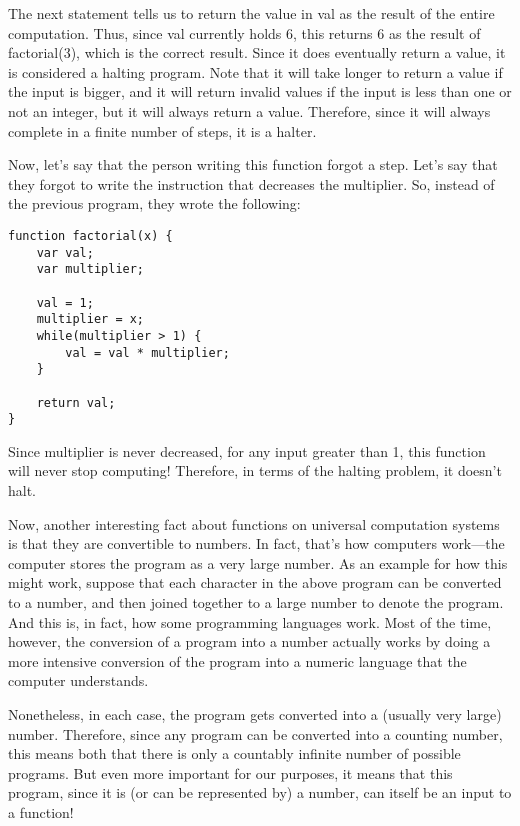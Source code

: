 The next statement tells us to return the value in val as the result of the entire computation.  Thus, since val currently holds 6, this returns 6 as the result of factorial(3), which is the correct result.  Since it does eventually return a value, it is considered a halting program.  Note that it will take longer to return a value if the input is bigger, and it will return invalid values if the input is less than one or not an integer, but it will always return a value.  Therefore, since it will always complete in a finite number of steps, it is a halter.

Now, let's say that the person writing this function forgot a step.  Let's say that they forgot to write the instruction that decreases the multiplier.  So, instead of the previous program, they wrote the following:

\begin{verbatim}
function factorial(x) {
	var val;
	var multiplier;

	val = 1;
	multiplier = x;
	while(multiplier > 1) {
		val = val * multiplier;
	}

	return val;
}
\end{verbatim}

Since multiplier is never decreased, for any input greater than 1, this function will never stop computing!  Therefore, in terms of the halting problem, it doesn't halt.

Now, another interesting fact about functions on universal computation systems is that they are convertible to numbers.  In fact, that's how computers work---the computer stores the program as a very large number.  As an example for how this might work, suppose that each character in the above program can be converted to a number, and then joined together to a large number to denote the program.  And this is, in fact, how some programming languages work.  Most of the time, however, the conversion of a program into a number actually works by doing a more intensive conversion of the program into a numeric language that the computer understands.  

Nonetheless, in each case, the program gets converted into a (usually very large) number.  Therefore, since any program can be converted into a counting number, this means both that there is only a countably infinite number of possible programs.  But even more important for our purposes, it means that this program, since it is (or can be represented by) a number, can itself be an input to a function!


